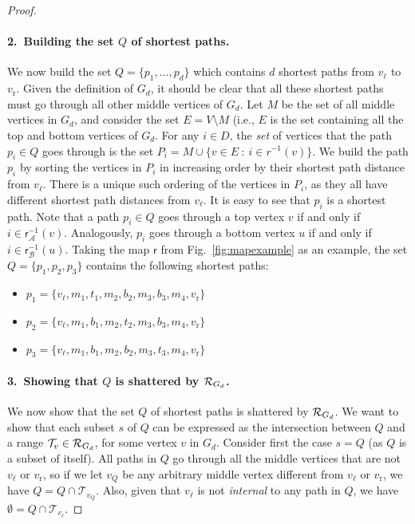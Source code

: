 \begin{proof}
  \paragraph{2.~Building the set $Q$ of shortest paths.} We now build the set
  $Q=\{p_1,\dotsc,p_d\}$ which contains $d$ shortest paths from $v_\ell$ to
  $v_\mathrm{r}$. Given the definition of $G_d$, it should be clear that all
  these shortest paths must go through all other middle vertices of $G_d$. Let
  $M$ be the set of all middle vertices in $G_d$, and consider the set
  $E=V\setminus M$ (i.e., $E$ is the set containing all the top and bottom
  vertices of $G_d$. For any $i\in D$, the \emph{set} of vertices that the path
  $p_i\in Q$ goes through is the set $P_i=M\cup\{v\in E ~:~ i \in r^{-1}(v)\}$.
  We build the path $p_i$ by sorting the vertices in $P_i$ in increasing order
  by their shortest path distance from $v_\ell$. There is a unique such ordering
  of the vertices in $P_i$, as they all have different shortest path distances
  from $v_\ell$. It is easy to see that $p_i$ is a shortest path. Note that a
  path $p_i\in Q$ goes through a top vertex $v$ if and only if
  $i\in\mathsf{r}^{-1}_\mathcal{A}(v)$. Analogously, $p_i$ goes through a bottom
  vertex $u$ if and only if $i\in\mathsf{r}^{-1}_\mathcal{B}(u)$. Taking the
  map $\mathsf{r}$ from Fig.~\ref{fig:mapexample} as an example, the set
  $Q=\{p_1,p_2,p_3\}$ contains the following shortest paths:
	\begin{itemize}
		\item $p_1=\{v_\ell,m_1,t_1,m_2,b_2,m_3,b_3,m_4,v_\mathrm{r}\}$
		\item $p_2=\{v_\ell,m_1,b_1,m_2,t_2,m_3,b_3,m_4,v_\mathrm{r}\}$
		\item $p_3=\{v_\ell,m_1,b_1,m_2,b_2,m_3,t_3,m_4,v_\mathrm{r}\}$
	\end{itemize}

  \paragraph{3.~Showing that $Q$ is shattered by $\mathcal{R}_{G_d}$.} We now show
  that the set $Q$ of shortest paths is shattered by $\mathcal{R}_{G_d}$. We want to
  show that each subset $s$ of $Q$ can be expressed as the intersection between
  $Q$ and a range $\mathcal{T}_v\in\mathcal{R}_{G_d}$, for some vertex $v$ in $G_d$.
  Consider first the case $s=Q$ (as $Q$ is a subset of itself). All paths in $Q$
  go through all the middle vertices that are not $v_\ell$ or $v_\mathrm{r}$, so
  if we let $v_Q$ be any arbitrary middle vertex different from $v_\ell$ or
  $v_\mathrm{r}$, we have $Q=Q\cap\mathcal{T}_{v_Q}$. Also, given that $v_\ell$
  is not \emph{internal} to any path in $Q$, we have
  $\emptyset=Q\cap\mathcal{T}_{v_\ell}$.
  

\end{proof}
